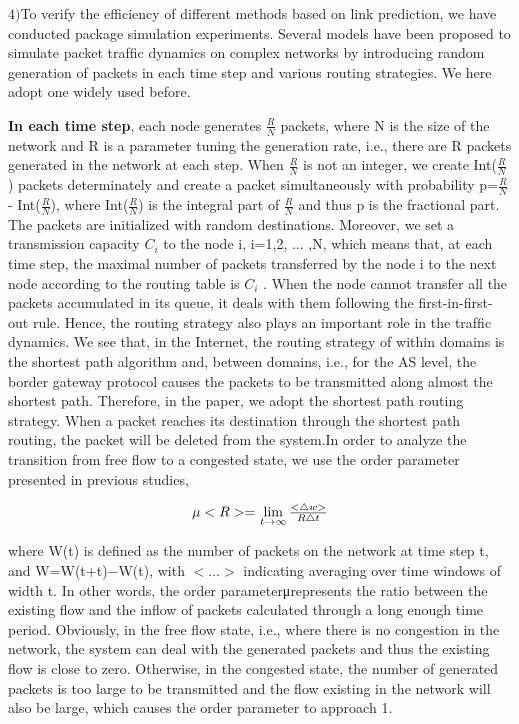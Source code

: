 \documentclass[onecolumn,preprintnumbers,amsmath,amssymb]{revtex4}
\begin{document}
$4)$To verify the efficiency of different methods based on link prediction, we have conducted package simulation experiments. Several models have been proposed to simulate packet trafﬁc dynamics on complex networks by introducing random generation of packets in each time step and various routing strategies. We here adopt one widely used before.

{\bf In each time step}, each node generates $\frac{R}{N}$ packets, where N is the size of the network and R is a parameter tuning the generation rate, i.e., there are R packets generated in the network at each step. When $\frac{R}{N}$ is not an integer, we create Int($\frac{R}{N}$) packets determinately and create a packet simultaneously with probability p=$\frac{R}{N}$ - Int($\frac{R}{N}$), where Int($\frac{R}{N}$) is the integral part of $\frac{R}{N}$ and thus p is the fractional part. The packets are initialized with random destinations. Moreover, we set a transmission capacity $C_i$ to the node i, i=1,2, ... ,N, which means that, at each time step, the maximal number of packets transferred by the node i to the next node according to the routing table is $C_i$ . When the node cannot transfer all the packets accumulated in its queue, it deals with them following the ﬁrst-in-ﬁrst-out rule. Hence, the routing strategy also plays an important role in the trafﬁc dynamics. We see that, in the Internet, the routing strategy of within domains is the shortest path algorithm and, between domains, i.e., for the AS level, the border gateway protocol causes the packets to be transmitted along almost the shortest path\cite{BVL}. Therefore, in the paper, we adopt the shortest path routing strategy. When a packet reaches its destination through the shortest path routing, the packet will be deleted from the system.In order to analyze the transition from free ﬂow to a congested state, we use the order parameter presented in previous studies\cite{MEN},

\begin{equation}
\centerline{
$\mu<R>=$
$\lim\limits_{t \to \infty }{\frac{< \bigtriangleup w >}{R\bigtriangleup t}}$
}
\end{equation}

where W(t) is deﬁned as the number of packets on the network at time step t, and W=W(t+t)−W(t), with $<…>$ indicating averaging over time windows of width t. In other words, the order parameterμrepresents the ratio between the existing ﬂow and the inﬂow of packets calculated through a long enough time period. Obviously, in the free ﬂow state, i.e., where there is no congestion in the network, the system can deal with the generated packets and thus the existing ﬂow is close to zero. Otherwise, in the congested state, the number of generated packets is too large to be transmitted and the ﬂow existing in the network will also be large, which causes the order parameter to approach 1.
\end{document}
